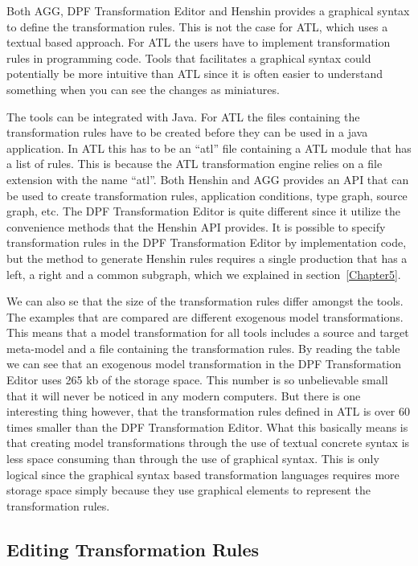 Both AGG, DPF Transformation Editor and Henshin provides a graphical syntax to
define the transformation rules. This is not the case for ATL, which uses a
textual based approach. For ATL the users have to implement transformation
rules in programming code. Tools that facilitates a graphical syntax could
potentially be more intuitive than ATL since it is often easier to understand
something when you can see the changes as miniatures. 

The tools can be integrated with Java. For ATL the files containing the
transformation rules have to be created before they can be used in a java
application. In ATL this has to be an ``atl'' file containing a ATL module that
has a list of rules. This is because the ATL transformation engine relies on a
file extension with the name ``atl''. Both Henshin and AGG provides an API that
can be used to create transformation rules, application conditions, type graph,
source graph, etc. The DPF Transformation Editor is quite different since it
utilize the convenience methods that the Henshin API provides. It is possible to
specify transformation rules in the DPF Transformation Editor by implementation
code, but the method to generate Henshin rules requires a single production that
has a left, a right and a common subgraph, which we explained in
section~\ref{Chapter5}.

We can also se that the size of the transformation rules differ amongst the
tools. The examples that are compared are different exogenous model
transformations. This means that a model transformation for all tools
includes a source and target meta-model and a file containing the transformation
rules. By reading the table we can see that an exogenous model transformation in
the DPF Transformation Editor uses 265 kb of the storage space. This number is
so unbelievable small that it will never be noticed in any modern computers.
But there is one interesting thing however, that the transformation rules
defined in ATL is over 60 times smaller than the DPF Transformation Editor.
What this basically means is that creating model transformations through the
use of textual concrete syntax is less space consuming than through the use of
graphical syntax. This is only logical since the graphical syntax based
transformation languages requires more storage space simply because they use
graphical elements to represent the transformation rules.

\subsection{Editing Transformation Rules}

